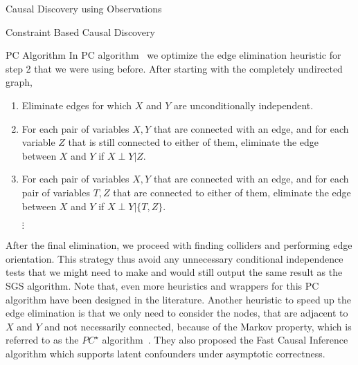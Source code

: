\documentclass[10pt]{article}
\begin{document}
\begin{psection}[3]{Causal Discovery using Observations}
\begin{psubsection}{Constraint Based Causal Discovery}
        \begin{pssubsection}{PC Algorithm}
            In PC algorithm~\cite{spirtes2000causation} we optimize the edge elimination
            heuristic for step 2 that we were using before. After starting with the
            completely undirected graph,
            \begin{enumerate}
                \item Eliminate edges for which $X$ and $Y$ are unconditionally
                    independent.
                \item For each pair of variables $X, Y$ that are connected with an edge,
                    and for each variable $Z$ that is still connected to either of them,
                    eliminate the edge between $X$ and $Y$ if $X \perp Y \vert Z$. 
                \item For each pair of variables $X, Y$ that are connected with an edge,
                    and for each pair of variables $T, Z$ that are connected to either
                    of them, eliminate the edge between $X$ and $Y$ if $X \perp Y \vert
                    \{T,Z\}$. 
                \item[{$\vdots$}] 
            \end{enumerate}

            After the final elimination, we proceed with finding colliders and
            performing edge orientation. This strategy thus avoid any unnecessary
            conditional independence tests that we might need to make and would still
            output the same result as the SGS algorithm.
            Note that, even more heuristics and wrappers for this PC algorithm  have
            been designed in the literature. Another heuristic to speed up the edge
            elimination is that we only need to consider the nodes, that are adjacent to
            $X$ and $Y$ and not necessarily connected, because of the Markov property,
            which is referred to as the $PC^{\star}$
            algorithm~\cite{spirtes2000causation}. They also proposed the Fast Causal
            Inference algorithm which supports latent confounders under asymptotic
            correctness.


\end{pssubsection}
\end{psubsection}
\end{psection}
\end{document}
